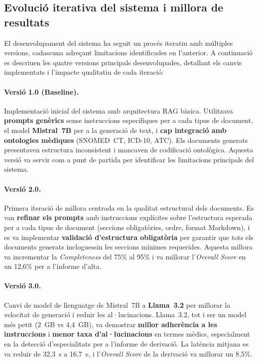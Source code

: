 \documentclass[CAT]{TFUOC}%
\begin{document}
\subsection{Evolució iterativa del sistema i millora de resultats}

El desenvolupament del sistema ha seguit un procés iteratiu amb múltiples versions, cadascuna adreçant limitacions identificades en l'anterior. A continuació es descriuen les quatre versions principals desenvolupades, detallant els canvis implementats i l'impacte qualitatiu de cada iteració:

\paragraph{Versió 1.0 (Baseline).}
Implementació inicial del sistema amb arquitectura RAG bàsica. Utilitzava \textbf{prompts genèrics} sense instruccions específiques per a cada tipus de document, el model \textbf{Mistral~7B} per a la generació de text, i \textbf{cap integració amb ontologies mèdiques} (SNOMED~CT, ICD-10, ATC). Els documents generats presentaven estructura inconsistent i mancaven de codificació ontològica. Aquesta versió va servir com a punt de partida per identificar les limitacions principals del sistema.

\paragraph{Versió 2.0.}
Primera iteració de millora centrada en la qualitat estructural dels documents. Es van \textbf{refinar els prompts} amb instruccions explícites sobre l'estructura esperada per a cada tipus de document (seccions obligatòries, ordre, format Markdown), i es va implementar \textbf{validació d'estructura obligatòria} per garantir que tots els documents generats incloguessin les seccions mínimes requerides. Aquesta millora va incrementar la \textit{Completeness} del 75\% al 95\% i va millorar l'\textit{Overall Score} en un 12,6\% per a l'informe d'alta.

\paragraph{Versió 3.0.}
Canvi de model de llenguatge de Mistral~7B a \textbf{Llama~3.2} per millorar la velocitat de generació i reduir les al·lucinacions. Llama~3.2, tot i ser un model més petit (2~GB vs 4,4~GB), va demostrar \textbf{millor adherència a les instruccions} i \textbf{menor taxa d'al·lucinacions} en termes mèdics, especialment en la detecció d'especialitats per a l'informe de derivació. La latència mitjana es va reduir de 32,3~s a 16,7~s, i l'\textit{Overall Score} de la derivació va millorar un 8,5\%.
\end{document}
